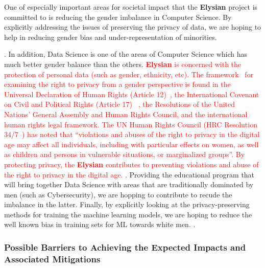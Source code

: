 \documentclass[a4paper,11pt]{article}
\newcommand{\project}[1]{\textbf{#1}\xspace}
\newcommand{\SECURITY}{\project{Elysian}}
\newcommand{\TheProject}{\SECURITY}
\begin{document}
\begin{mdframed}[backgroundcolor=blue!5]
One of especially important areas for societal impact that the \TheProject{} project is committed to is reducing the gender imbalance in Computer Science. By explicitly addressing the issues of preserving the privacy of data, we are hoping to help in reducing gender bias and under-representation of minorities.  

. In addition, Data Science is one of the areas of Computer Science which has much better gender balance than the others. \textcolor{red}{\TheProject{} is concerned with the protection of personal data (such as gender, ethnicity, etc). The framework~\cite{51} for examining the right to privacy from a gender perspective is found in the Universal Declaration of Human Rights (Article 12)~\cite{52}, the International Covenant on Civil and Political Rights (Article 17)
~\cite{53}, the Resolutions of the United Nations' General Assembly and Human Rights Council, and the international human rights legal framework. The UN Human Rights Council (HRC Resolution 34/7~\cite{54}) has noted that ``violations and abuses of the right to privacy in the digital age may affect all individuals, including with particular effects on women, as well as children and persons in vulnerable situations, or marginalized groups''. By protecting privacy, the \TheProject{} contributes to preventing violations and abuse of the right to privacy in the digital age.} . Providing the educational program that will bring together Data Science with areas that are traditionally dominated by men (such as Cybersecurity), we are hopping to contribute to recude the imbalance in the latter. Finally, by explicitly looking at the privacy-preserving methods for training the machine learning models, we are hoping to reduce the well known bias in training sets for ML towards white men. . 
\end{mdframed}
 

\noindent
\subsubsection*{Possible Barriers to Achieving the Expected Impacts and Associated Mitigations}

\end{document}

